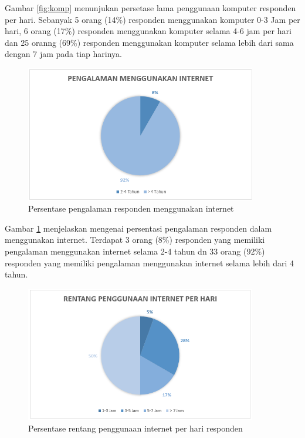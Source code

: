 \noindent
Gambar \ref{fig:komp} menunjukan persetase lama penggunaan komputer responden per hari. Sebanyak 5 orang (14\%) responden menggunakan komputer 0-3 Jam per hari, 6 orang (17\%) responden menggunakan komputer selama 4-6 jam per hari dan 25 oranng (69\%) responden menggunakan komputer selama lebih dari sama dengan 7 jam pada tiap harinya.
\begin{figure}
	\centering
	\includegraphics[width=0.9\textwidth,height=0.52\textwidth]
	{pics/pengalamanInternet.PNG}
	\caption{Persentase pengalaman responden menggunakan internet}
	\label{fig:lamainet}
\end{figure}
\noindent
Gambar \ref{fig:lamainet} menjelaskan mengenai persentasi pengalaman responden dalam menggunakan internet. Terdapat 3 orang (8\%) responden yang memiliki pengalaman menggunakan internet selama 2-4 tahun dn 33 orang (92\%) responden yang memiliki pengalaman menggunakan internet selama lebih dari 4 tahun.
\begin{figure}
	\centering
	\includegraphics[width=0.9\textwidth,height=0.52\textwidth]
	{pics/pakeInternetperhari.PNG}
	\caption{Persentase rentang penggunaan internet per hari responden}
	\label{fig:maininet}
\end{figure}
